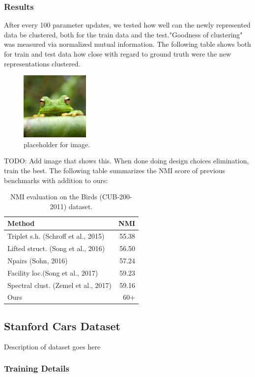 \subsubsection{Results}
After every 100 parameter updates, we tested how well can the newly represented data be clustered, both for the train data and the test."Goodness of clustering" was measured via normalized mutual information. The following table shows both for train and test data how close with regard to ground truth were the new representations clustered.\\
\begin{figure}[h!]
\centering
\includegraphics[width=0.3\textwidth]{imgs/frog.jpg}
\caption{\label{fig:frog}placeholder for image.}
\end{figure}
TODO: Add image that shows this. When done doing design choices elimination, train the best.
The following table summarizes the NMI score of previous benchmarks with addition to ours:
\begin{table}[h!]
\centering
\begin{tabular}{l|r}
Method & NMI \\\hline
Triplet s.h. (Schroff et al., 2015) & 55.38 \\
Lifted struct. (Song et al., 2016) & 56.50 \\
Npairs (Sohn, 2016) & 57.24 \\
Facility loc.(Song et al., 2017) & 59.23 \\
Spectral clust. (Zemel et al., 2017) & 59.16 \\
Ours & 60+ 
\end{tabular}
\caption{\label{tab:score compare} NMI evaluation on the Birds (CUB-200-
2011) dataset.}
\end{table}
\subsection{Stanford Cars Dataset}
Description of dataset goes here
\subsubsection{Training Details}
